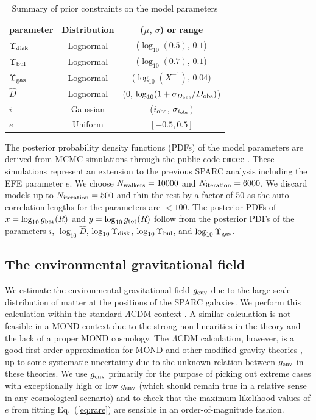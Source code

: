 \documentclass[twocolumn,tighten]{aastex63}
\begin{document}
\begin{table}
\caption{Summary of prior constraints on the model parameters}
\begin{center}
  \begin{tabular}{lcc} \hline
 parameter  &  Distribution  & ($\mu$, $\sigma$) or range \\
 \hline
 $\Upsilon_{\rm disk}$     & Lognormal  & ($\log_{10}(0.5)$, $0.1$)     \\
 $\Upsilon_{\rm bul}$      & Lognormal  & ($\log_{10}(0.7)$, $0.1$)  \\
 $\Upsilon_{\rm gas}$      & Lognormal  &  ($\log_{10}(X^{-1})$, $0.04$)     \\
 $\hat{D}$                 & Lognormal  & ($0$, $\log_{10}(1+\sigma_{D_{\rm obs}}/D_{\rm obs})$)      \\
 $i$                       & Gaussian   & ($i_{\rm obs}$, $\sigma_{i_{\rm obs}}$)    \\
 $e$                       &  Uniform   &  $[-0.5,0.5]$\\
 \hline
\end{tabular}
\end{center}
\end{table}

The posterior probability density functions (PDFs) of the model parameters are derived from MCMC simulations through the public code {\tt emcee} \citep{emcee}. These simulations represent an extension to the previous SPARC analysis \citep{Li18} including the EFE parameter $e$. We choose $N_{\rm walkers}=10000$ and $N_{\rm iteration}=6000$. We discard models up to $N_{\rm iteration}=500$ and thin the rest by a factor of 50 as the auto-correlation lengths for the parameters are $<100$. The posterior PDFs of $x = \log_{10} g_{\rm bar}(R)$ and $y = \log_{10} g_{\rm tot}(R)$ follow from the posterior PDFs of the parameters $i$, $\log_{10} \hat{D}$, $\log_{10} \Upsilon_{\rm disk}$, $\log_{10} \Upsilon_{\rm bul}$, and $\log_{10} \Upsilon_{\rm gas}$.

\subsection{The environmental gravitational field}  \label{sec:genv}

We estimate the environmental gravitational field $g_{\rm env}$ due to the large-scale distribution of matter at the positions of the SPARC galaxies. We perform this calculation within the standard $\Lambda$CDM context \citep{Des18}. A similar calculation is not feasible in a MOND context due to the strong non-linearities in the theory and the lack of a proper MOND cosmology. The $\Lambda$CDM calculation, however, is a good first-order approximation for MOND and other modified gravity theories \citep{Des18}, up to some systematic uncertainty due to the unknown relation between $g_{\rm env}$ in these theories. We use $g_{\rm env}$ primarily for the purpose of picking out extreme cases with exceptionally high or low $g_{\rm env}$ (which should remain true in a relative sense in any cosmological scenario) and to check that the maximum-likelihood values of $e$ from fitting Eq.~(\ref{eq:rare}) are sensible in an order-of-magnitude fashion.
\end{document}
